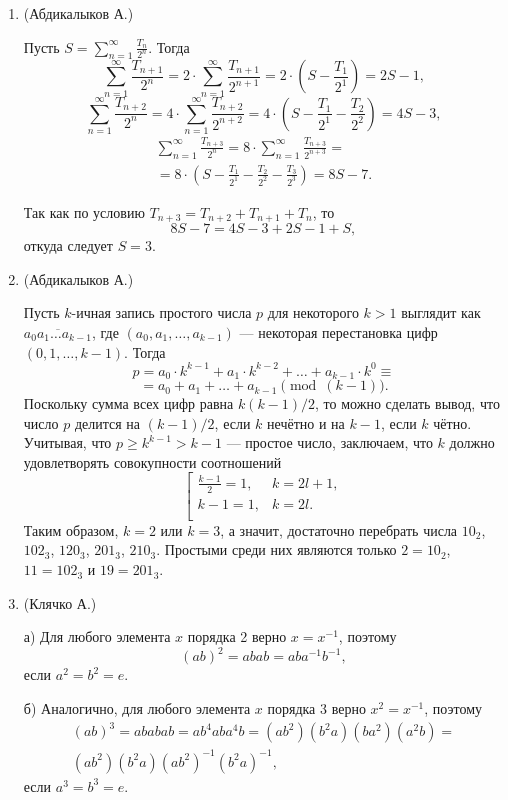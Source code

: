 \begin{enumerate}

\item (Абдикалыков А.)

Пусть $S=\displaystyle\sum\limits_{n=1}^{\infty}{\frac{T_n}{2^n}}$. Тогда
$$
\sum\limits_{n=1}^{\infty}{\frac{T_{n+1}}{2^n}}=2\cdot \sum\limits_{n=1}^{\infty}{\frac{T_{n+1}}{2^{n+1}}}=2\cdot \left(S-\frac{T_1}{2^1}\right)=2S-1,
$$
$$
\sum\limits_{n=1}^{\infty}{\frac{T_{n+2}}{2^n}}=4\cdot \sum\limits_{n=1}^{\infty}{\frac{T_{n+2}}{2^{n+2}}}=4\cdot\left(S-\frac{T_1}{2^1}-\frac{T_2}{2^2}\right)=4S-3,
$$
\begin{multline*}
\sum\limits_{n=1}^{\infty}{\frac{T_{n+3}}{2^n}}=8\cdot \sum\limits_{n=1}^{\infty}{\frac{T_{n+3}}{2^{n+3}}}=\\
=8\cdot\left(S-\frac{T_1}{2^1}-\frac{T_2}{2^2}-\frac{T_3}{2^3}\right)=8S-7.
\end{multline*}

Так как по условию $T_{n+3}=T_{n+2}+T_{n+1}+T_n$, то $$8S-7=4S-3+2S-1+S,$$ откуда следует $S=3$.

\item (Абдикалыков А.)

Пусть $k$-ичная запись простого числа $p$ для некоторого $k>1$ выглядит как $\overline{a_0a_1\hdots a_{k-1}}$, где $(a_0, a_1, \hdots, a_{k-1})$ --- некоторая перестановка цифр $(0, 1, \hdots, k-1)$. Тогда
$$
p = a_0\cdot k^{k-1} + a_1\cdot k^{k-2}+\hdots+a_{k-1}\cdot k^0 \equiv
$$
$$
= a_0+a_1+\hdots+a_{k-1} \pmod {(k-1)}.
$$
Поскольку сумма всех цифр равна $k(k-1)/2$, то можно сделать вывод, что число $p$ делится на $(k-1)/2$, если $k$ нечётно и на $k-1$, если $k$ чётно. Учитывая, что $p\geqslant k^{k-1}>k-1$ --- простое число, заключаем, что $k$ должно удовлетворять совокупности соотношений
$$
\left[
\begin{matrix}
\frac{k-1}{2}=1,& k = 2l+1,\\
k-1=1, & k = 2l.\\
\end{matrix}
\right.
$$
Таким образом, $k=2$ или $k=3$, а значит, достаточно перебрать числа $10_2$, $102_3$, $120_3$, $201_3$, $210_3$. Простыми среди них являются только $2=10_2$, $11=102_3$ и $19=201_3$.

\item (Клячко А.)

а) Для любого элемента $x$ порядка 2 верно $x=x^{-1}$, поэтому
$$
(ab)^2=abab=aba^{-1}b^{-1},
$$
если $a^2=b^2=e$.

б) Аналогично, для любого элемента $x$ порядка 3 верно $x^2=x^{-1}$, поэтому
\begin{multline*}
(ab)^3=ababab=ab^4aba^4b=(ab^2)(b^2a)(ba^2)(a^2b)=\\
(ab^2)(b^2a)(ab^2)^{-1}(b^2a)^{-1},
\end{multline*}
если $a^3=b^3=e$.


\end{enumerate}
